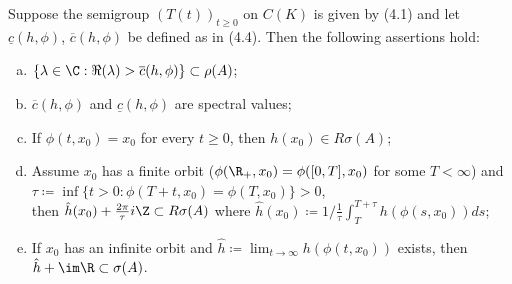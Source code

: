 \begin{proposition}\label{prop:b3-4.8}
	Suppose the semigroup $(T(t))_{t\geq 0}$ on $C(K)$ is given by (4.1) and let $\underline{c}(h,\phi)$, $\overline{c}(h,\phi)$ be defined as in (4.4).
	Then the following assertions hold:
	\begin{enumerate}[(a)]
		\item 
		$\{\lambda \in \C : \Re(\lambda) > \overline{c}(h,\phi)\} \subset \rho(A)$;
		
		\item 
		$\overline{c}(h,\phi)$ and $\underline{c}(h,\phi)$ are spectral values;
		
		\item 
		If $\phi(t,x_{0}) = x_{0}$ for every $t \geq 0$, then $h(x_{0}) \in R{\sigma}(A)$;
		
		\item 
		Assume $x_{0}$ has a finite orbit (\ie $\phi(\R_{+},x_{0}) = \phi([0,T],x_{0})$ for some $T < \infty$) and $\tau \coloneq \inf\{t > 0 : \phi(T+t,x_{0}) = \phi(T,x_{0})\} > 0$, \\
		then $\hat{h}(x_{0}) + \frac{2\pi}{\tau}i\Z \subset R{\sigma}(A)$ where $\hat{h}(x_{0}) \coloneq 1/
		\frac{1}{\tau}\int_{T}^{T+\tau}h(\phi(s,x_{0}))ds$;
		
		\item 
		If $x_{0}$ has an infinite orbit and $\hat{h} \coloneq  \lim_{t\to\infty}h(\phi(t,x_{0}))$ exists, then $\hat{h} + \im\R \subset \sigma(A)$.
	\end{enumerate}
\end{proposition}
